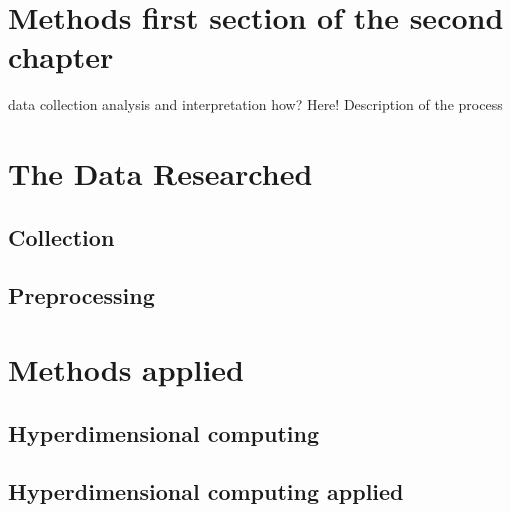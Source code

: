 \section{Methods first section of the second chapter}
data collection analysis and interpretation how? Here!
Description of the process

\section{The Data Researched}

\subsection{Collection}

\subsection{Preprocessing}

\section{Methods applied}

\subsection{Hyperdimensional computing}

\subsection{Hyperdimensional computing applied}


%
%
%
%
